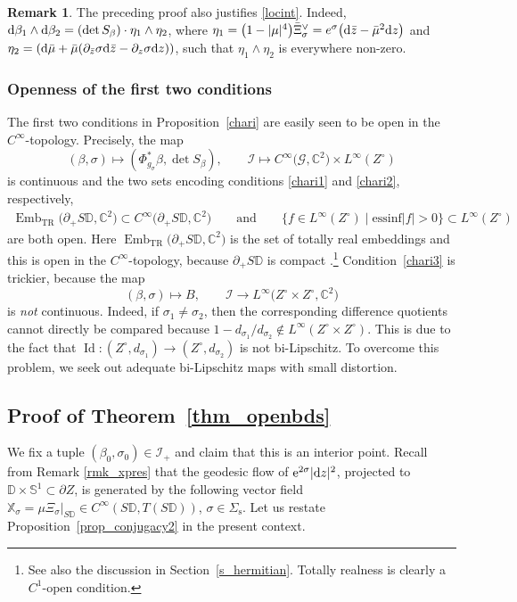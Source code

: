 \documentclass[pdftex]{sigma}
\numberwithin{equation}{section}
\theoremstyle{definition}
\newtheorem{Remark}[Theorem]{Remark}
\newcommand{\C}{\mathbb{C}} %
\newcommand{\DD}{\mathbb{D}} %
\newcommand{\1}{{\bf 1}}
\newcommand{\Id}{\operatorname{Id}}
\begin{document}
\begin{Remark}\label{rlocint}
The preceding proof also justifies \eqref{locint}. Indeed, ${\rm d}\beta_1 \wedge {\rm d}\beta_2 = (\det S_\beta)\cdot \eta_1\wedge \eta_2$, where $\eta_1 = \bigl(1-|\mu|^4\bigr) \bar\Xi_\sigma^\vee = e^\sigma \bigl({\rm d}\bar z - \bar \mu^2 {\rm d}z\bigr)$ and $\eta_2 = ({\rm d}\bar \mu + \bar \mu(\partial_{\bar z}\sigma {\rm d}\bar z - \partial_z \sigma {\rm d}z))$, such that $\eta_1\wedge \eta_2$ is everywhere non-zero.
\end{Remark}


\subsubsection{Openness of the first two conditions} The first two conditions in Proposition~\ref{chari} are easily seen to be open in the $C^\infty$-topology. Precisely, the map
\[
(\beta,\sigma) \mapsto (\Phi_{g_\sigma}^*\beta,  \det S_\beta ),\qquad \mathcal I\mapsto C^\infty\bigl(\mathcal G,\C^2\bigr)\times L^\infty(Z^\circ)	
\]
is continuous and the two sets encoding conditions \ref{chari1} and \ref{chari2}, respectively,
\begin{gather*}
\operatorname{Emb}_\mathrm{TR}\bigl(\partial_+S\DD,\C^2\bigr)\subset C^\infty\bigl(\partial_+S\DD,\C^2\bigr)\!\qquad \text{and} \!\qquad\{f\in L^\infty(Z^\circ)\mid \mathrm{ess inf } |f| > 0 \} \subset L^\infty(Z^\circ)
\end{gather*}
are both open. Here $\operatorname{Emb}_\mathrm{TR}\bigl(\partial_+ S\DD,\C^2\bigr)$ is the set of totally real embeddings and this is open in the $C^\infty$-topology, because $\partial_+S\DD$ is compact \cite[Chapter~2, Theorem~1.4]{Hir76}.\footnote{See also the discussion in Section~\ref{s_hermitian}. Totally realness is clearly a $C^1$-open condition.}
Condition~\ref{chari3} is trickier, because the map
\[
	(\beta,\sigma)\mapsto B,\qquad \mathcal I\rightarrow L^\infty\bigl(Z^\circ\times Z^\circ,\C^2\bigr)
\]
is {\it not} continuous. Indeed, if $\sigma_1\neq \sigma_2$, then the corresponding difference quotients cannot directly be compared because $1-d_{\sigma_1}/d_{\sigma_2}\notin L^\infty(Z^\circ\times Z^\circ)$. This is due to the fact that $\Id\colon (Z^\circ,d_{\sigma_1})\rightarrow (Z^\circ,d_{\sigma_2})$ is not bi-Lipschitz. To overcome this problem, we seek out adequate bi-Lipschitz maps with small distortion.

\subsection[Proof of Theorem 3.10]{Proof of Theorem~\ref{thm_openbds}} \label{pf_openbds} We fix a tuple $(\beta_0,\sigma_0) \in \mathcal I_+$ and claim that this is an interior point. Recall from Remark \ref{rmk_xpres} that the geodesic flow of ${\rm e}^{2\sigma}|{\rm d} z|^2$, projected to $\DD\times \mathbb S^1\subset \partial Z$, is generated by the following vector field
$
\mathbb X_\sigma = \mu \Xi_\sigma|_{S\DD}\in C^\infty(S\DD,T(S\DD))$,  $\sigma \in \Sigma_\mathrm{s}$.
Let us restate Proposition~\ref{prop_conjugacy2} in the present context.
\end{document}
